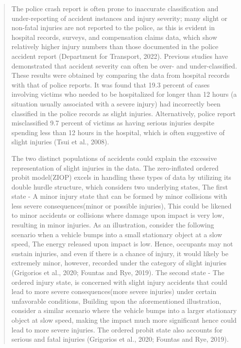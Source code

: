 \documentclass[12]{report}
\begin{document}
\begin{quote}
{The police crash report is often prone to inaccurate classification and under-reporting of accident instances and injury severity; many slight or non-fatal injuries are not reported to the police, as this is evident in hospital records, surveys, and compensation claims data, which show relatively higher injury numbers than those documented in the police accident report (Department for Transport, 2022). Previous studies have demonstrated that accident severity can often be over- and under-classified. These results were obtained by comparing the data from hospital records with that of police reports. It was found that 19.3 percent of cases involving victims who needed to be hospitalized for longer than 12 hours (a situation usually associated with a severe injury) had incorrectly been classified in the police records as slight injuries. Alternatively, police report misclassified 9.7 percent of victims as having serious injuries despite spending less than 12 hours in the hospital, which is often suggestive of slight injuries (Tsui et al., 2008). 

The two distinct populations of accidents could explain the excessive representation of slight injuries in the data. The zero-inflated ordered probit model(ZIOP) excels in handling these types of data by utilizing its double hurdle structure, which considers two underlying states, The first state - A minor injury state that can be formed by minor collisions with less severe consequences(minor or possible injuries), This could be likened to minor accidents or collisions where damage upon impact is very low, resulting in minor injuries. As an illustration, consider the following scenario when a vehicle bumps into a small stationary object at a slow speed, The energy released upon impact is low. Hence, occupants may not sustain injuries, and even if there is a chance of injury, it would likely be extremely minor, however, recorded under the category of slight injuries (Grigorios et al., 2020; Fountas and Rye, 2019). The second state - The ordered injury state, is concerned with slight injury accidents that could lead to more severe consequences(more severe injuries) under certain unfavorable conditions, Building upon the aforementioned illustration, consider a similar scenario where the vehicle bumps into a larger stationary object at slow speed, making the impact much more significant hence could lead to more severe injuries. The ordered probit state also accounts for serious and fatal injuries (Grigorios et al., 2020; Fountas and Rye, 2019).

}
\end{quote}
\end{document}
